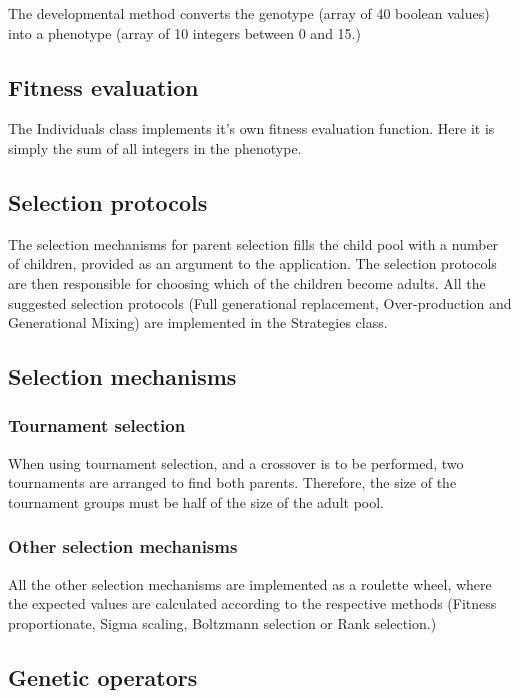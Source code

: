 \documentclass[11pt]{article}
\begin{document}
The developmental method converts the genotype (array of 40 boolean values) into
a phenotype (array of 10 integers between 0 and 15.)

\subsection*{Fitness evaluation}

The Individuals class implements it's own fitness evaluation function. Here
it is simply the sum of all integers in the phenotype.

\subsection*{Selection protocols}

The selection mechanisms for parent selection fills the child pool with
a number of children, provided as an argument to the application.
The selection protocols are then responsible for choosing which of the 
children become adults. All the suggested selection protocols (Full generational 
replacement, Over-production and Generational Mixing) are implemented
in the Strategies class.

\subsection*{Selection mechanisms}

\subsubsection*{Tournament selection}

When using tournament selection, and a crossover is to be performed, two
tournaments are arranged to find both parents. Therefore, the size of the
tournament groups must be half of the size of the adult pool.

\subsubsection*{Other selection mechanisms}

All the other selection mechanisms are implemented as a roulette wheel, where
the expected values are calculated according to the respective methods (Fitness proportionate,
Sigma scaling, Boltzmann selection or Rank selection.)

\subsection*{Genetic operators}
\end{document}
